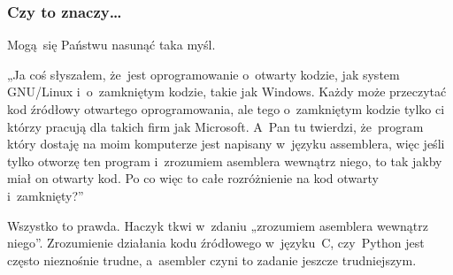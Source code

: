 \documentclass[10pt,t]{beamer}
\begin{document}
\begin{frame}
  \frametitle{Czy to znaczy\ldots}


  Mogą~się Państwu nasunąć taka myśl.

  „Ja coś słyszałem, że~jest oprogramowanie o~otwarty kodzie, jak system
  GNU/Linux i~o~zamkniętym kodzie, takie jak Windows. Każdy może przeczytać
  kod źródłowy otwartego oprogramowania, ale tego o~zamkniętym kodzie tylko
  ci którzy pracują dla takich firm jak Microsoft. A~Pan tu twierdzi,
  że~program który dostaję na moim komputerze jest napisany w~języku
  assemblera, więc jeśli tylko otworzę ten program i~zrozumiem asemblera
  wewnątrz niego, to tak jakby miał on otwarty kod. Po co więc to całe
  rozróżnienie na kod otwarty i~zamknięty?”

  Wszystko to prawda. Haczyk tkwi w~zdaniu „zrozumiem asemblera wewnątrz
  niego”. Zrozumienie działania kodu źródłowego w~języku~C, czy~Python jest
  często nieznośnie trudne, a~asembler czyni to zadanie jeszcze
  trudniejszym.

\end{frame}
\end{document}
